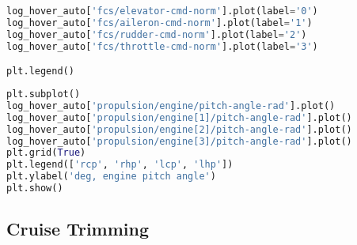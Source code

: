 \begin{lstlisting}[language=Python]
log_hover_auto['fcs/elevator-cmd-norm'].plot(label='0')
log_hover_auto['fcs/aileron-cmd-norm'].plot(label='1')
log_hover_auto['fcs/rudder-cmd-norm'].plot(label='2')
log_hover_auto['fcs/throttle-cmd-norm'].plot(label='3')

plt.legend()
\end{lstlisting}

\begin{lstlisting}[language=Python]
plt.subplot()
log_hover_auto['propulsion/engine/pitch-angle-rad'].plot()
log_hover_auto['propulsion/engine[1]/pitch-angle-rad'].plot()
log_hover_auto['propulsion/engine[2]/pitch-angle-rad'].plot()
log_hover_auto['propulsion/engine[3]/pitch-angle-rad'].plot()
plt.grid(True)
plt.legend(['rcp', 'rhp', 'lcp', 'lhp'])
plt.ylabel('deg, engine pitch angle')
plt.show()
\end{lstlisting}

\hypertarget{cruise-trimming}{%
\subsection{Cruise Trimming}\label{cruise-trimming}}

